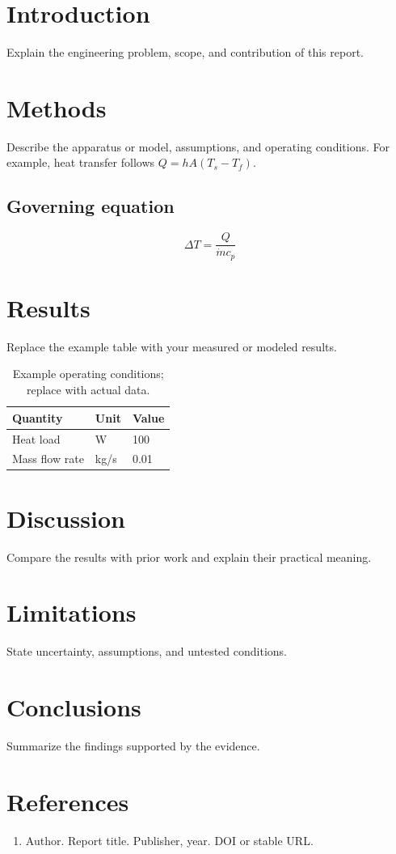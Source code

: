 \documentclass{article}
\begin{document}
\section{Introduction}
Explain the engineering problem, scope, and contribution of this report.

\section{Methods}
Describe the apparatus or model, assumptions, and operating conditions.
For example, heat transfer follows $Q = h A (T_s - T_f)$.

\subsection{Governing equation}
\[
\Delta T = \frac{Q}{\dot{m} c_p}
\]

\section{Results}
Replace the example table with your measured or modeled results.
\begin{table}[ht]
\caption{Example operating conditions; replace with actual data.}
\begin{tabular}{lll}
\toprule
Quantity & Unit & Value \\
\midrule
Heat load & W & 100 \\
Mass flow rate & kg/s & 0.01 \\
\bottomrule
\end{tabular}
\end{table}


\section{Discussion}
Compare the results with prior work and explain their practical meaning.
\section{Limitations}
State uncertainty, assumptions, and untested conditions.
\section{Conclusions}
Summarize the findings supported by the evidence.
\section{References}
\begin{enumerate}
\item Author. Report title. Publisher, year. DOI or stable URL.
\end{enumerate}
\end{document}
